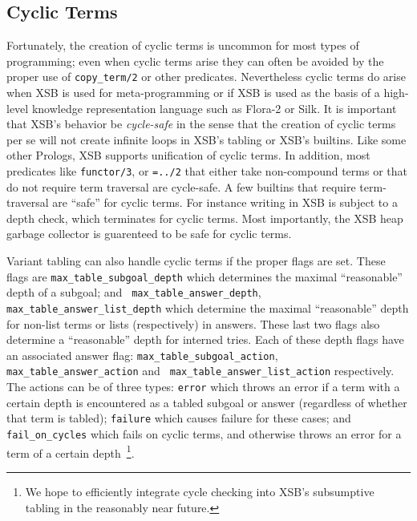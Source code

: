 \subsection{Cyclic Terms}
%
    Fortunately, the creation of cyclic terms is uncommon for most
    types of programming; even when cyclic terms arise they can often
    be avoided by the proper use of {\tt copy\_term/2} or other
    predicates.  Nevertheless cyclic terms do arise when XSB is used
    for meta-programming or if XSB is used as the basis of a
    high-level knowledge representation language such as Flora-2 or
    Silk.  It is important that XSB's behavior be {\em cycle-safe} in
    the sense that the creation of cyclic terms per se will not create
    infinite loops in XSB's tabling or XSB's builtins.  Like some
    other Prologs, XSB supports unification of cyclic terms.  In
    addition, most predicates like {\tt functor/3}, or {\tt =../2}
    that either take non-compound terms or that do not require term
    traversal are cycle-safe.  A few builtins that require
    term-traversal are ``safe'' for cyclic terms.  For instance
    writing in XSB is subject to a depth check, which terminates for
    cyclic terms.  Most importantly, the XSB heap garbage collector is
    guarenteed to be safe for cyclic terms.

    Variant tabling can also handle cyclic terms if the proper flags
    are set.  These flags are {\tt max\_table\_subgoal\_depth} which
    determines the maximal ``reasonable'' depth of a subgoal; and {\tt
      max\_table\_answer\_depth}, {\tt
      max\_table\_answer\_list\_depth} which determine the maximal
    ``reasonable'' depth for non-list terms or lists (respectively) in
    answers.  These last two flags also determine a ``reasonable''
    depth for interned tries.  Each of these depth flags have an
    associated answer flag: {\tt max\_table\_subgoal\_action}, {\tt
      max\_table\_answer\_action} and {\tt
      max\_table\_answer\_list\_action} respectively.  The actions can
    be of three types: {\tt error} which throws an error if a term
    with a certain depth is encountered as a tabled subgoal or answer
    (regardless of whether that term is tabled); {\tt failure} which
    causes failure for these cases; and {\tt fail\_on\_cycles} which
    fails on cyclic terms, and otherwise throws an error for a term of
    a certain depth~\footnote{We hope to efficiently integrate cycle
      checking into XSB's subsumptive tabling in the reasonably near
      future.}.

